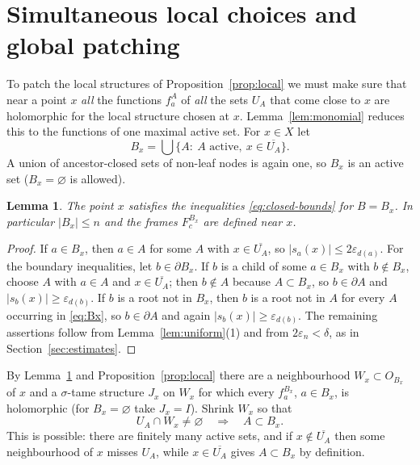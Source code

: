 \documentclass[12pt]{article}
\newtheorem{lemma}[theorem]{Lemma}
\theoremstyle{remark}
\newcommand{\eps}{\varepsilon}
\begin{document}
\section{Simultaneous local choices and global patching}\label{sec:patching}

To patch the local structures of Proposition~\ref{prop:local} we must
make sure that near a point $x$ \emph{all} the functions $f^A_a$ of
\emph{all} the sets $U_A$ that come close to $x$ are holomorphic for
the local structure chosen at $x$. Lemma~\ref{lem:monomial} reduces
this to the functions of one maximal active set. For $x\in X$ let
\begin{equation}\label{eq:Bx}
 B_x=\bigcup\{A:\ A\text{ active},\ x\in\overline{U_A}\}.
\end{equation}
A union of ancestor-closed sets of non-leaf nodes is again one, so
$B_x$ is an active set ($B_x=\varnothing$ is allowed).

\begin{lemma}\label{lem:Bx}
The point $x$ satisfies the inequalities \eqref{eq:closed-bounds} for
$B=B_x$. In particular $|B_x|\le n$ and the frames $F^{B_x}_c$ are
defined near $x$.
\end{lemma}

\begin{proof}
If $a\in B_x$, then $a\in A$ for some $A$ with $x\in\overline{U_A}$,
so $|s_a(x)|\le2\eps_{d(a)}$. For the boundary inequalities, let
$b\in\partial B_x$. If $b$ is a child of some $a\in B_x$ with
$b\notin B_x$, choose $A$ with $a\in A$ and $x\in\overline{U_A}$; then
$b\notin A$ because $A\subset B_x$, so $b\in\partial A$ and
$|s_b(x)|\ge\eps_{d(b)}$. If $b$ is a root not in $B_x$, then $b$ is a
root not in $A$ for every $A$ occurring in \eqref{eq:Bx}, so
$b\in\partial A$ and again $|s_b(x)|\ge\eps_{d(b)}$. The remaining
assertions follow from Lemma~\ref{lem:uniform}(1) and from
$2\eps_n<\delta$, as in Section~\ref{sec:estimates}.
\end{proof}

By Lemma~\ref{lem:Bx} and Proposition~\ref{prop:local} there are a
neighbourhood $W_x\subset O_{B_x}$ of $x$ and a $\sigma$-tame structure
$J_x$ on $W_x$ for which every $f^{B_x}_a$, $a\in B_x$, is holomorphic
(for $B_x=\varnothing$ take $J_x=I$). Shrink $W_x$ so that
\begin{equation}\label{eq:shrink}
 U_A\cap W_x\ne\varnothing\quad\Longrightarrow\quad A\subset B_x .
\end{equation}
This is possible: there are finitely many active sets, and if
$x\notin\overline{U_A}$ then some neighbourhood of $x$ misses $U_A$,
while $x\in\overline{U_A}$ gives $A\subset B_x$ by definition.
\end{document}

